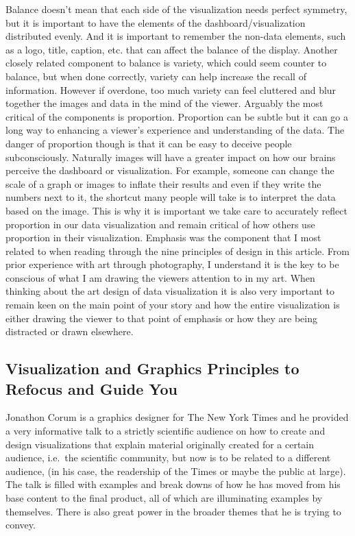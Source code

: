 \documentclass[]{book}
\theoremstyle{definition}
\theoremstyle{definition}
\theoremstyle{definition}
\theoremstyle{remark}
\begin{document}
Balance doesn't mean that each side of the visualization needs perfect
symmetry, but it is important to have the elements of the
dashboard/visualization distributed evenly. And it is important to
remember the non-data elements, such as a logo, title, caption, etc.
that can affect the balance of the display. Another closely related
component to balance is variety, which could seem counter to balance,
but when done correctly, variety can help increase the recall of
information. However if overdone, too much variety can feel cluttered
and blur together the images and data in the mind of the viewer.
Arguably the most critical of the components is proportion. Proportion
can be subtle but it can go a long way to enhancing a viewer's
experience and understanding of the data. The danger of proportion
though is that it can be easy to deceive people subconsciously.
Naturally images will have a greater impact on how our brains perceive
the dashboard or visualization. For example, someone can change the
scale of a graph or images to inflate their results and even if they
write the numbers next to it, the shortcut many people will take is to
interpret the data based on the image. This is why it is important we
take care to accurately reflect proportion in our data visualization and
remain critical of how others use proportion in their visualization.
Emphasis was the component that I most related to when reading through
the nine principles of design in this article. From prior experience
with art through photography, I understand it is the key to be conscious
of what I am drawing the viewers attention to in my art. When thinking
about the art design of data visualization it is also very important to
remain keen on the main point of your story and how the entire
visualization is either drawing the viewer to that point of emphasis or
how they are being distracted or drawn elsewhere.

\subsection{Visualization and Graphics Principles to Refocus and Guide
You}\label{visualization-and-graphics-principles-to-refocus-and-guide-you}

Jonathon Corum is a graphics designer for The New York Times and he
provided a very informative talk to a strictly scientific audience on
how to create and design visualizations that explain material originally
created for a certain audience, i.e.~the scientific community, but now
is to be related to a different audience, (in his case, the readership
of the Times or maybe the public at large). The talk is filled with
examples and break downs of how he has moved from his base content to
the final product, all of which are illuminating examples by themselves.
There is also great power in the broader themes that he is trying to
convey.
\end{document}
